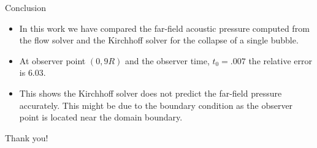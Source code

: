 \documentclass[10pt, aspectratio=169]{beamer}
\begin{document}
\begin{frame}{Conclusion}
	\begin{itemize}
		\item In this work we have compared the far-field acoustic pressure computed from the flow solver and the Kirchhoff solver for the collapse of a single bubble.   
		\item At observer point $(0, 9R)$ and the observer time,  $t_0 = .007$ the relative error is $6.03$.
		\item This shows the Kirchhoff solver does not predict the far-field pressure accurately. This might be due to the boundary condition as the observer point is located near the domain boundary.  
	\end{itemize}
\end{frame}
\begin{frame}[standout]
	Thank you!
\end{frame}
\end{document}
